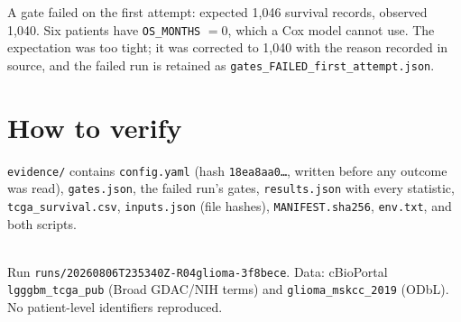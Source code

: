 \documentclass[11pt,a4paper]{article}
\begin{document}
\noindent
A gate failed on the first attempt: expected 1{,}046 survival records, observed 1{,}040. Six
patients have \texttt{OS\_MONTHS} $=0$, which a Cox model cannot use. The expectation was
too tight; it was corrected to 1{,}040 with the reason recorded in source, and the failed
run is retained as \texttt{gates\_FAILED\_first\_attempt.json}.

\section{How to verify}

\texttt{evidence/} contains \texttt{config.yaml} (hash \texttt{18ea8aa0\ldots}, written
before any outcome was read), \texttt{gates.json}, the failed run's gates,
\texttt{results.json} with every statistic, \texttt{tcga\_survival.csv},
\texttt{inputs.json} (file hashes), \texttt{MANIFEST.sha256}, \texttt{env.txt}, and both
scripts.

\vfill
\noindent{\color{qgrey}\rule{\textwidth}{0.4pt}}\\
{\footnotesize\color{qgrey}Run \texttt{runs/20260806T235340Z-R04glioma-3f8bece}. Data:
cBioPortal \texttt{lgggbm\_tcga\_pub} (Broad GDAC/NIH terms) and
\texttt{glioma\_mskcc\_2019} (ODbL). No patient-level identifiers reproduced.}
\end{document}
